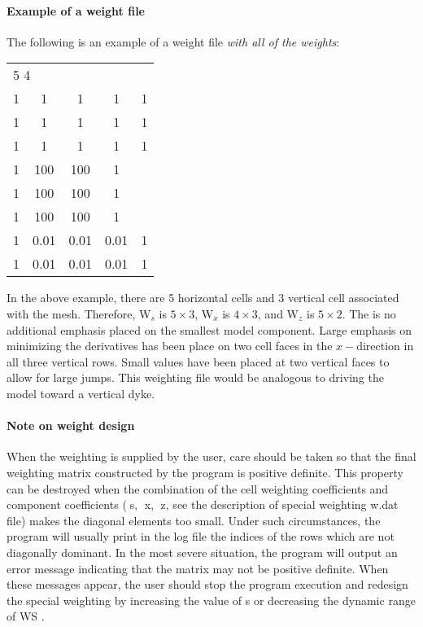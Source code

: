 \paragraph{Example of a weight file} 

The following is an example of a weight file \textit{with all of the weights}:

\begin{fileExample}
\begin{tabular}{|ccccc|}
\hline
\multicolumn{5}{|l|}{5 4} \\
1 & 1 & 1 & 1 & 1 \\
1 & 1 & 1 & 1 & 1 \\
1 & 1 & 1 & 1 & 1 \\
1 & 100 & 100 & 1 & \\
1 & 100 & 100 & 1 & \\
1 & 100 & 100 & 1 & \\
1 & 0.01 & 0.01 & 0.01 & 1 \\
1 & 0.01 & 0.01 & 0.01 & 1 \\
\hline
\end{tabular}
\end{fileExample}

In the above example, there are 5 horizontal cells and 3 vertical cell associated with the mesh. Therefore, W$_s$ is $5 \times 3$, W$_x$ is $4 \times 3$, and W$_z$ is $5 \times 2$. The is no additional emphasis placed on the smallest model component. Large emphasis on minimizing the derivatives has been place on two cell faces in the $x-$direction in all three vertical rows. Small values have been placed at two vertical faces to allow for large jumps. This weighting file would be analogous to driving the model toward a vertical dyke.

\paragraph{Note on weight design} When the weighting is supplied by the user, care should be taken so that the final weighting matrix constructed by the program is positive definite. This property can be destroyed when the combination of the cell weighting coefficients and component coefficients (s, x, z, see the description of special weighting w.dat file) makes the diagonal elements too small. Under such circumstances, the program will usually print in the log file the indices of the rows which are not diagonally dominant. In the most severe situation, the program will output an error message indicating that the matrix may not be positive definite. When these messages appear, the user should stop the program execution and redesign the special weighting by increasing the value of  s or decreasing the dynamic range of WS . 